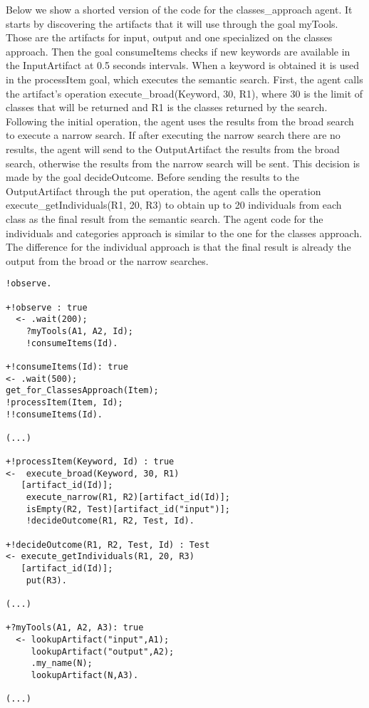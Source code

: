\documentclass[a4paper,twoside]{article}
\begin{document}
Below we show a shorted version of the code for the classes\_approach agent. It starts by discovering the artifacts that it will use through the goal myTools. Those are the artifacts for input, output and  one specialized on the classes approach. Then the goal consumeItems checks if new keywords are available in the InputArtifact at 0.5 seconds intervals. When a keyword is obtained it is used in the processItem goal, which executes the semantic search. First, the agent calls the artifact's operation execute\_broad(Keyword, 30, R1), where 30 is the limit of classes that will be returned and R1 is the classes returned by the search. Following the initial operation, the agent uses the results from the broad search to execute a narrow search. If after executing the narrow search there are no results, the agent will send to the OutputArtifact the results from the broad search, otherwise the results from the narrow search will be sent. This decision is made by the goal decideOutcome. Before sending the results to the OutputArtifact through the put operation, the agent calls the operation execute\_getIndividuals(R1, 20, R3) to obtain up to 20 individuals from each class as the final result from the semantic search. The agent code for the individuals and categories approach is similar to the one for the classes approach. The difference for the individual approach is that the final result is already the output from the broad or the narrow searches.

\begin{small}
\begin{verbatim}
!observe.

+!observe : true 
  <- .wait(200); 
    ?myTools(A1, A2, Id);
    !consumeItems(Id).

+!consumeItems(Id): true
<- .wait(500);
get_for_ClassesApproach(Item);
!processItem(Item, Id);
!!consumeItems(Id).

(...)

+!processItem(Keyword, Id) : true
<-  execute_broad(Keyword, 30, R1)
   [artifact_id(Id)];
	execute_narrow(R1, R2)[artifact_id(Id)];
	isEmpty(R2, Test)[artifact_id("input")];
	!decideOutcome(R1, R2, Test, Id).	

+!decideOutcome(R1, R2, Test, Id) : Test
<- execute_getIndividuals(R1, 20, R3)
   [artifact_id(Id)];
	put(R3).
	
(...)
	
+?myTools(A1, A2, A3): true 
  <- lookupArtifact("input",A1);
  	 lookupArtifact("output",A2);
	 .my_name(N);
	 lookupArtifact(N,A3).
	 
(...)
\end{verbatim}
\end{small}
\end{document}
